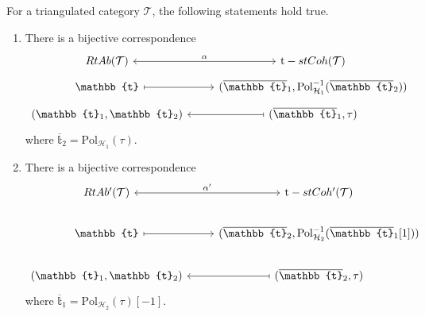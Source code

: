 \begin{thm}\label{thm:2.11}
  For a triangulated category $\mathcal{T}$, the following statements hold true.
  \begin{enumerate}[label=(\alph*)]
    \item There is a bijective correspondence
      \begin{equation*}
        \begin{tikzcd}[row sep=tiny]
          RtAb(\mathcal{T})\arrow[leftrightarrow]{r}{\alpha}
            & \mathrm{t}-stCoh(\mathcal{T})\\
          \mathbb{t}\arrow[mapsto]{r}
            & (\overline{\mathbb{t}}_1,\mathrm{Pol}^{-1}_{\mathcal{H}_1}(\overline{\mathbb{t}}_2))\\
          (\mathbb{t}_1,\mathbb{t}_2)\arrow[mapsfrom]{r}
            & (\overline{\mathbb{t}}_1,\tau)
        \end{tikzcd}
      \end{equation*}
      where $\overline{\mathbb{t}}_2=\mathrm{Pol}_{\mathcal{H}_1}(\tau)$.
    \item There is a bijective correspondence
      \begin{equation*}
        \begin{tikzcd}
          RtAb^\prime(\mathcal{T})\arrow[leftrightarrow]{r}{\alpha'}
            & \mathrm{t}-stCoh^\prime(\mathcal{T})\\
          \mathbb{t}\arrow[mapsto]{r}
            & (\overline{\mathbb{t}}_2,\mathrm{Pol}^{-1}_{\mathcal{H}_2}(\overline{\mathbb{t}}_1[1]))\\
          (\mathbb{t}_1,\mathbb{t}_2)\arrow[mapsfrom]{r}
            & (\overline{\mathbb{t}}_2,\tau)
        \end{tikzcd}
      \end{equation*}
      where $\overline{\mathbb{t}}_1=\mathrm{Pol}_{\mathcal{H}_2}(\tau)[-1]$.
  \end{enumerate}
\end{thm}


